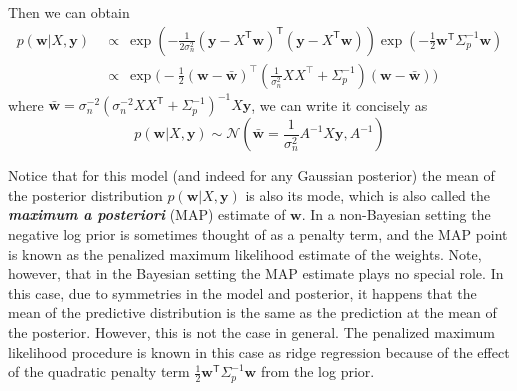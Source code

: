 \documentclass[10pt]{elegantbook}
\newcommand{\mydefination}[1]{\textbf{\textit{\textcolor{structurecolor}{#1}}}}
\begin{document}
Then we can obtain
\begin{equation}
    \begin{aligned}
        p(\mathbf{w}|X,\mathbf{y})\ &\propto\ 
        \exp\left(-{\frac{1}{2\sigma_{n}^{2}}}(\mathbf{y}-X^{\mathsf{T}}\mathbf{w})^{\mathsf{T}}(\mathbf{y}-X^{\mathsf{T}}\mathbf{w})\right)\exp\left(-{\frac{1}{2}}\mathbf{w}^{\mathsf{T}}\Sigma_{p}^{-1}\mathbf{w}\right) \\
        &\propto\ 
        \exp{\bigl(-\frac{1}{2}(\mathbf w-\bar{\mathbf w})^{\top}}(\frac{1}{\sigma_{n}^{2}}X X^{\top}+\Sigma_{p}^{-1})(\mathbf w-\bar{\mathbf w})\bigr)
    \end{aligned}
\end{equation}
where $\bar{\textbf{w}}=\sigma_{n}^{-2}(\sigma_{n}^{-2}X X^{\textsf{T}}+\Sigma_{p}^{-1})^{-1}X{\mathbf{y}}$,
we can write it concisely as
\begin{equation}
    p(\mathbf{w}|X,\mathbf{y})\sim{\mathcal{N}}({\bar{\mathbf{w}}}=\frac{1}{\sigma_{n}^{2}}A^{-1}X\mathbf{y},A^{-1})
\end{equation}

Notice that for this model (and indeed for any
Gaussian posterior) the mean of the posterior distribution $p(\mathbf{w}|X,\mathbf{y})$ is also
its mode, which is also called the \mydefination{maximum a posteriori} (MAP) estimate of $\mathbf{w}$.
In a non-Bayesian setting the negative log prior is sometimes thought of
as a penalty term, and the MAP point is known as the penalized maximum
likelihood estimate of the weights. Note, however, that in the Bayesian setting the MAP
estimate plays no special role. In this case, due to symmetries in the model and posterior, it happens that the mean
of the predictive distribution is the same as the prediction at the mean of the posterior.
However, this is not the case in general. The penalized maximum likelihood procedure is known in this case as ridge regression
because of the effect of the quadratic penalty term $\frac{1}{2}\mathbf{w}^{\mathsf{T}}\Sigma_{p}^{-1}\mathbf{w}$ from the log prior.
\end{document}
